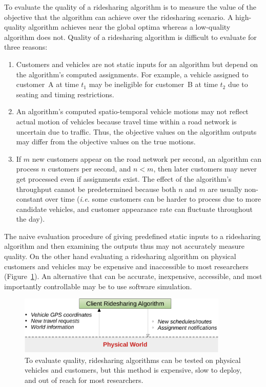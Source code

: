 To evaluate the quality of a ridesharing algorithm is to measure the
value of the objective that the algorithm can achieve over the ridesharing
scenario. A high-quality algorithm achieves near the global optima whereas a
low-quality algorithm does not. Quality of a ridesharing algorithm is difficult
to evaluate for three reasons:
\begin{enumerate}
\item {}
Customers and vehicles are not static inputs for an algorithm but depend on the
algorithm's computed assignments. For example, a vehicle assigned to
customer~A at time $t_1$ may be ineligible for customer~B at time $t_2$ due to
seating and timing restrictions.
\item {}
An algorithm's computed spatio-temporal vehicle motions may not reflect actual
motion of vehicles because travel time within a road network is uncertain due
to traffic. Thus, the objective values on the algorithm outputs may differ from the
objective values on the true motions.
\item {} If $m$ new customers appear on the road network
per second, an algorithm can process $n$ customers per second, and $n<m$, then
later customers may never get processed even if assignments exist. The effect
of the algorithm's throughput cannot be predetermined because both $n$ and $m$
are usually non-constant over time (\textit{i.e.} some customers can be harder
to process due to more candidate vehicles, and customer appearance rate can
fluctuate throughout the day).
\end{enumerate}

The naive evaluation procedure of giving predefined static inputs to a
ridesharing algorithm and then examining the outputs thus may not accurately
measure quality. On the other hand evaluating a ridesharing algorithm on
physical customers and vehicles may be expensive and inaccessible to most
researchers (Figure~\ref{fig:physical}).  An alternative that can be accurate,
inexpensive, accessible, and most importantly controllable may be to use
software simulation.

\begin{figure}[h]
\centering
\includegraphics[width=100mm]{res/physical}
\caption{To evaluate quality, ridesharing algorithms can be tested on physical
vehicles and customers, but this method is expensive, slow to deploy, and out
of reach for most researchers.}
\label{fig:physical}
\end{figure}

